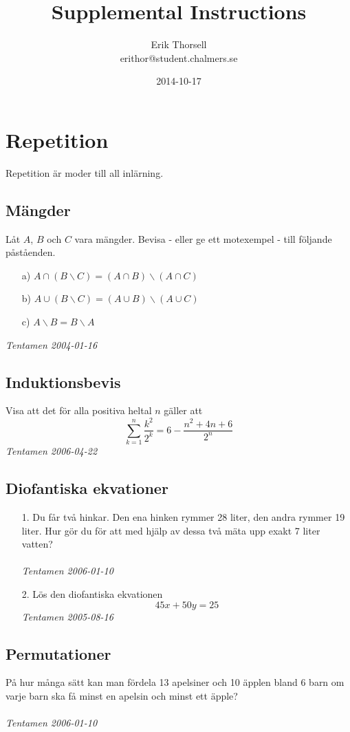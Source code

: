 \documentclass{article}
\title{Supplemental Instructions}
\author{Erik Thorsell \\ 
		\small{erithor@student.chalmers.se}
}
\date{2014-10-17}
\begin{document}
\maketitle


\section*{Repetition}
Repetition är moder till all inlärning.

\subsection*{Mängder}
Låt $A$, $B$ och $C$ vara mängder. Bevisa - eller ge ett motexempel - till 
följande påståenden.
\begin{itemize}
\item[a)] $A \cap (B \backslash C) = (A \cap B) \backslash (A \cap C)$
\item[b)] $A \cup (B \backslash C) = (A \cup B) \backslash (A \cup C)$
\item[c)] $A \backslash B = B \backslash A$
\end{itemize}
{\it Tentamen 2004-01-16}

\subsection*{Induktionsbevis}
Visa att det för alla positiva heltal $n$ gäller att 
$$\sum_{k=1}^{n} \frac{k^2}{2^k} = 6 - \frac{n^2+4n+6}{2^n}$$
{\it Tentamen 2006-04-22}


\subsection*{Diofantiska ekvationer}
\begin{itemize}
\item[1.] 
Du får två hinkar. Den ena hinken rymmer 28 liter, den andra rymmer 19 liter.
Hur gör du för att med hjälp av dessa två mäta upp exakt 7 liter vatten?\\
\\
{\it Tentamen 2006-01-10}

\item[2.]
Lös den diofantiska ekvationen $$45x+50y=25$$
{\it Tentamen 2005-08-16}
\end{itemize}

\subsection*{Permutationer}
På hur många sätt kan man fördela 13 apelsiner och 10 äpplen bland 6 barn 
om varje barn ska få minst en apelsin och minst ett äpple?\\
\\
{\it Tentamen 2006-01-10}
\end{document}
